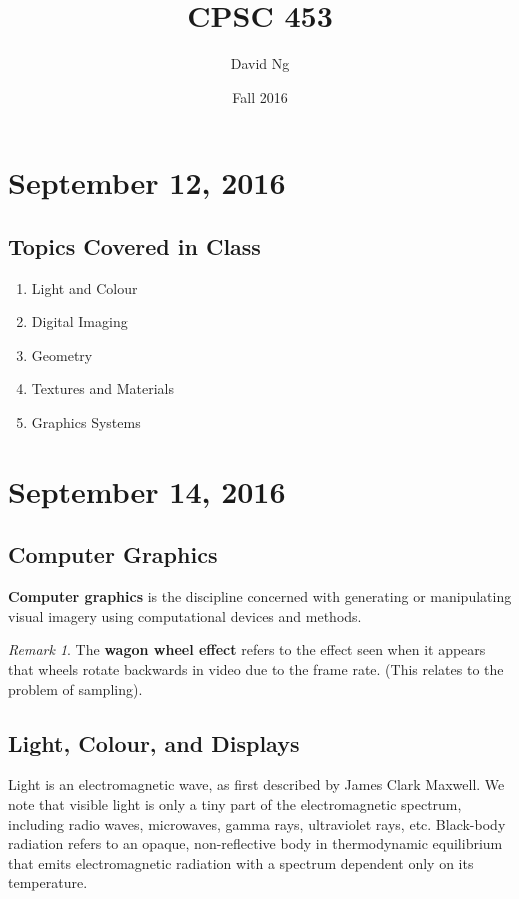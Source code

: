 \documentclass[11pt]{article}
\theoremstyle{plain} %
\theoremstyle{definition}
\theoremstyle{example}
\theoremstyle{remark}
\newtheorem*{remark}{Remark}
\begin{document}
\title{CPSC 453}
\author{David Ng}
\date{Fall 2016}
\maketitle

\tableofcontents

\eject


\section{September 12, 2016}

\subsection{Topics Covered in Class}

\begin{enumerate}
	\item Light and Colour
	\item Digital Imaging
	\item Geometry
	\item Textures and Materials
	\item Graphics Systems
\end{enumerate}
\section{September 14, 2016}
\subsection{Computer Graphics}

\textbf{Computer graphics} is the discipline concerned with generating or manipulating visual imagery using computational devices and methods.

\begin{remark}The \textbf{wagon wheel effect} refers to the effect seen when it appears that wheels rotate backwards in video due to the frame rate. (This relates to the problem of sampling). 
\end{remark}
\subsection{Light, Colour, and Displays}

Light is an electromagnetic wave, as first described by James Clark Maxwell. We note that visible light is only a tiny part of the electromagnetic spectrum, including radio waves, microwaves, gamma rays, ultraviolet rays, etc. Black-body radiation refers to an opaque, non-reflective body in thermodynamic equilibrium that emits electromagnetic radiation with a spectrum dependent only on its temperature. 
\end{document}
